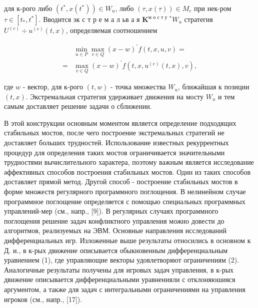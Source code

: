 \documentclass[10pt]{article}
\begin{document}
для к-рого либо $\left(t^{*}, x\left(t^{*}\right)\right) \in W_{u}$, либо $(\tau, x(\tau)) \in M_{c}$ при нек-ром $\tau \in\left[t_{*}, t^{*}\right]$. Вводится эк с т р е м а л ьв а я $\boldsymbol{K}^{\text {м о с т у }}{ }^{*} W_{u}$ стратегия $U^{(e)} \div u^{(e)}(t, x)$, определяемая соотношением



\[

\begin{aligned}

& \min _{u \in P} \max _{v \in Q}(x-w)^{\prime} f(t, x, u, v)= \\

= & \max _{v \in Q}(x-w)^{\prime} f\left(t, x, u^{(e)}(t, x), v\right),

\end{aligned}

\]



где $w$ - вектор, для к-рого $(t, w)$ - точка множества $W_{u}$, ближайшая к позиции $(t, x)$. Экстремальная стратегия удерживает движения на мосту $W_{u}$ и тем самым доставляет решение задачи о сближении.



В этой конструкции основным моментом является определение подходящих стабильных мостов, после чего построение экстремальных стратегий не доставляет больших трудностей. Использование известных рекуррентных процедур для определения таких мостов ограничивается значительными трудностями вычислительного характера, поэтому важным является исследование әффективных способов построения стабильных мостов. Один из таких способов доставляет прямой метод. Другой способ - построение стабильных мостов в форме множеств регулярного программного поглощения. В нелинейном случае программное поглощение определяется с помощью специальных программных управлений-мер (см., напр., [9]). В регулярных случаях программного поглощения решение задач конфликтного управления можно довести до алгоритмов, реализуемых на ЭВМ. Основные направления исследований дифференциальных игр. Изложенные выше результаты относились в основном к Д. и., в к-рых движение описывается обыкновенным дифференциальным уравнением (1), где управляющие векторы удовлетворяют ограничениям (2). Аналогичные результаты получены для игровых задач управления, в к-рых движение описывается дифференциальными уравненияли с отклоняюшияся аргументом, а также для задач с интегральными ограничениями на управления игроков (см., напр., [17]).
\end{document}
